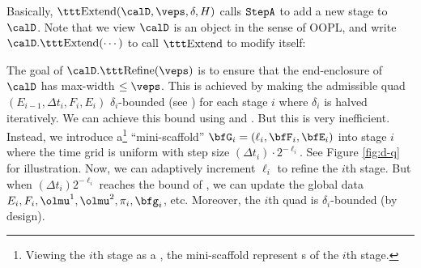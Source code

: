 	Basically, 
	$\Extend(\calD, \veps,\delta,H)$
		calls ${\mbox{\tt StepA}}$ to add a new stage to $\calD$.
		Note that we view $\calD$ is an object in the sense
		of OOPL, and write $\calD.\Extend(\cdots)$ to call
		$\Extend$ to modify itself: 

	{\scriptsize
	\Ldent{}}

	The goal of $\calD.\Refine(\veps)$ is to ensure that
	the end-enclosure of $\calD$ has max-width $\le \veps$.
	This is achieved by making the admissible quad
			$(E_{i-1},\Delta t_i, F_i, E_i)$
	$\delta_i$-bounded (see )
	for each stage $i$ where $\delta_i$ is halved
	iteratively. We can achieve this bound using
	 and .  But this is very inefficient.
	Instead, we introduce a\footnote{
		Viewing the $i$th stage as a \bigStep,
		the mini-scaffold represent \smallStep s of 
		the $i$th stage. 
	} 
	``mini-scaffold'' $\bfG_i=(\ell_i, \bfF_i,\bfE_i)$
	into stage $i$ where the time grid is uniform
	with step size $(\Delta t_i)\cdot 2^{-\ell_i}$.
	See Figure \ref{fig:d-q} for illustration.
	Now, we can adaptively increment $\ell_i$ to refine the
	$i$th stage.
	But when $(\Delta t_i)2^{-\ell_i}$ reaches the bound
	of , we can update the global data
	$E_i, F_i, \olmu^1, \olmu^2, \pi_i, \bfg_i$, etc.
	Moreover, the $i$th quad is $\delta_i$-bounded
	(by design).
	

